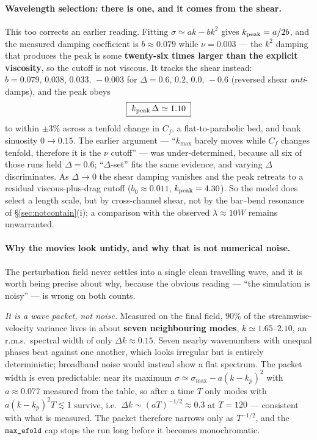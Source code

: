 \documentclass[11pt]{article}
\newcommand{\code}[1]{\texttt{\small #1}}
\begin{document}
\paragraph{Wavelength selection: there is one, and it comes from the shear.} This too
corrects an earlier reading. Fitting $\sigma\simeq ak-bk^{2}$ gives $k_{\rm peak}=a/2b$,
and the measured damping coefficient is $b\approx0.079$ while $\nu=0.003$ --- the $k^2$
damping that produces the peak is some \textbf{twenty-six times larger than the explicit
viscosity}, so the cutoff is not viscous. It tracks the shear instead:
$b=0.079,\,0.038,\,0.033,\,-0.003$ for $\Delta=0.6,\,0.2,\,0.0,\,-0.6$ (reversed shear
\emph{anti}-damps), and the peak obeys
\begin{equation}
  \boxed{\;k_{\rm peak}\,\Delta\simeq1.10\;}
\end{equation}
to within $\pm3\%$ across a tenfold change in $C_f$, a flat-to-parabolic bed, and bank
sinuosity $0\to0.15$. The earlier argument --- ``$k_{\max}$ barely moves while $C_f$
changes tenfold, therefore it is the $\nu$ cutoff'' --- was under-determined, because
all six of those runs held $\Delta=0.6$; ``$\Delta$-set'' fits the same evidence, and
varying $\Delta$ discriminates. As $\Delta\to0$ the shear damping vanishes and the peak
retreats to a residual viscous-plus-drag cutoff ($b_0\approx0.011$, $k_{\rm peak}=4.30$).
So the model does select a length scale, but by cross-channel shear, not by the
bar--bend resonance of \S\ref{sec:notcontain}(i); a comparison with the observed
$\lambda\approx10W$ remains unwarranted.

\paragraph{Why the movies look untidy, and why that is not numerical noise.}
The perturbation field never settles into a single clean travelling wave, and it is
worth being precise about why, because the obvious reading --- ``the simulation is
noisy'' --- is wrong on both counts.

\emph{It is a wave packet, not noise.} Measured on the final field, $90\%$ of the
streamwise-velocity variance lives in about \textbf{seven neighbouring modes},
$k\simeq1.65$--$2.10$, an r.m.s.\ spectral width of only $\Delta k\approx0.15$. Seven
nearby wavenumbers with unequal phases beat against one another, which looks irregular
but is entirely deterministic; broadband noise would instead show a flat spectrum. The
packet width is even predictable: near its maximum $\sigma\simeq\sigma_{\max}-a(k-k_p)^2$
with $a\approx0.077$ measured from the table, so after a time $T$ only modes with
$a(k-k_p)^2T\lesssim1$ survive, i.e.\ $\Delta k\sim(aT)^{-1/2}\approx0.3$ at $T=120$ ---
consistent with what is measured. The packet therefore narrows only as $T^{-1/2}$, and
the $\code{max\_efold}$ cap stops the run long before it becomes monochromatic.
\end{document}
